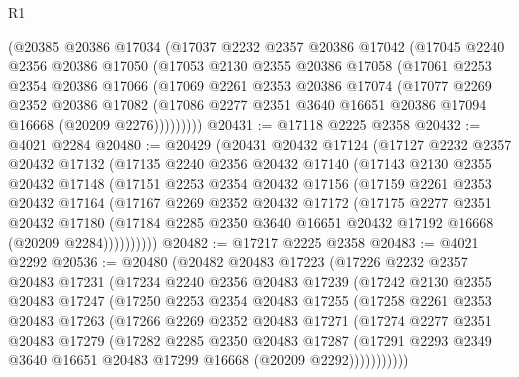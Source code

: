 \begin{lexlean}{R1}
\begin{coremodule}
    (@20385
      @20386
      @17034
      (@17037
        @2232
        @2357
        @20386
        @17042
        (@17045
          @2240
          @2356
          @20386
          @17050
          (@17053
            @2130
            @2355
            @20386
            @17058
            (@17061
              @2253
              @2354
              @20386
              @17066
              (@17069
                @2261
                @2353
                @20386
                @17074
                (@17077
                  @2269
                  @2352
                  @20386
                  @17082
                  (@17086 @2277 @2351 @3640 @16651 @20386 @17094 @16668 (@20209 @2276)))))))))
@20431 := @17118 @2225 @2358
@20432 := @4021 @2284
@20480 := @20429
    (@20431
      @20432
      @17124
      (@17127
        @2232
        @2357
        @20432
        @17132
        (@17135
          @2240
          @2356
          @20432
          @17140
          (@17143
            @2130
            @2355
            @20432
            @17148
            (@17151
              @2253
              @2354
              @20432
              @17156
              (@17159
                @2261
                @2353
                @20432
                @17164
                (@17167
                  @2269
                  @2352
                  @20432
                  @17172
                  (@17175
                    @2277
                    @2351
                    @20432
                    @17180
                    (@17184 @2285 @2350 @3640 @16651 @20432 @17192 @16668 (@20209 @2284))))))))))
@20482 := @17217 @2225 @2358
@20483 := @4021 @2292
@20536 := @20480
    (@20482
      @20483
      @17223
      (@17226
        @2232
        @2357
        @20483
        @17231
        (@17234
          @2240
          @2356
          @20483
          @17239
          (@17242
            @2130
            @2355
            @20483
            @17247
            (@17250
              @2253
              @2354
              @20483
              @17255
              (@17258
                @2261
                @2353
                @20483
                @17263
                (@17266
                  @2269
                  @2352
                  @20483
                  @17271
                  (@17274
                    @2277
                    @2351
                    @20483
                    @17279
                    (@17282
                      @2285
                      @2350
                      @20483
                      @17287
                      (@17291 @2293 @2349 @3640 @16651 @20483 @17299 @16668 (@20209 @2292)))))))))))

\end{coremodule}
\end{lexlean}
